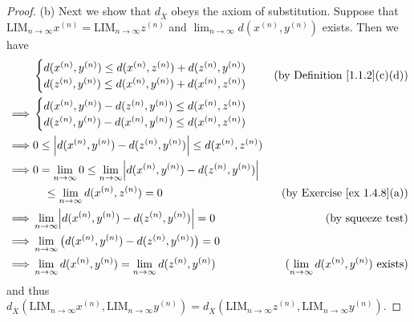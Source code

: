 \begin{proof}{(b)}
    Next we show that \(d_{\overline{X}}\) obeys the axiom of substitution.
    Suppose that \(\text{LIM}_{n \to \infty} x^{(n)} = \text{LIM}_{n \to \infty} z^{(n)}\) and \(\lim_{n \to \infty} d(x^{(n)}, y^{(n)})\) exists.
    Then we have
    \begin{align*}
                 & \begin{cases}
                       d(x^{(n)}, y^{(n)}) \leq d(x^{(n)}, z^{(n)}) + d(z^{(n)}, y^{(n)}) \\
                       d(z^{(n)}, y^{(n)}) \leq d(x^{(n)}, y^{(n)}) + d(x^{(n)}, z^{(n)})
                   \end{cases}                              & \text{(by Definition \ref{1.1.2}(c)(d))}                                                                              \\
        \implies & \begin{cases}
                       d(x^{(n)}, y^{(n)}) - d(z^{(n)}, y^{(n)}) \leq d(x^{(n)}, z^{(n)}) \\
                       d(z^{(n)}, y^{(n)}) - d(x^{(n)}, y^{(n)}) \leq d(x^{(n)}, z^{(n)})
                   \end{cases}                                                                                               \\
        \implies & 0 \leq \abs{d(x^{(n)}, y^{(n)}) - d(z^{(n)}, y^{(n)})} \leq d(x^{(n)}, z^{(n)})                                                                                  \\
        \implies & 0 = \lim_{n \to \infty} 0 \leq \lim_{n \to \infty} \abs{d(x^{(n)}, y^{(n)}) - d(z^{(n)}, y^{(n)})}                                                               \\
                 & \quad \leq \lim_{n \to \infty} d(x^{(n)}, z^{(n)}) = 0                                             & \text{(by Exercise \ref{ex 1.4.8}(a))}                      \\
        \implies & \lim_{n \to \infty} \abs{d(x^{(n)}, y^{(n)}) - d(z^{(n)}, y^{(n)})} = 0                            & \text{(by squeeze test)}                                    \\
        \implies & \lim_{n \to \infty} \big(d(x^{(n)}, y^{(n)}) - d(z^{(n)}, y^{(n)})\big) = 0                                                                                      \\
        \implies & \lim_{n \to \infty} d(x^{(n)}, y^{(n)}) = \lim_{n \to \infty} d(z^{(n)}, y^{(n)})                  & \text{(\(\lim_{n \to \infty} d(x^{(n)}, y^{(n)})\) exists)}
    \end{align*}
    and thus \(d_{\overline{X}}(\text{LIM}_{n \to \infty} x^{(n)}, \text{LIM}_{n \to \infty} y^{(n)}) = d_{\overline{X}}(\text{LIM}_{n \to \infty} z^{(n)}, \text{LIM}_{n \to \infty} y^{(n)})\).


\end{proof}
